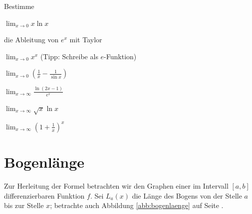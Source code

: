 \documentclass[%
11pt,%
twoside,%
titlepage,%
german,%
headsepline%
]{scrartcl}
\begin{document}
\begin{ueb}
Bestimme
\begin{enumeratea}
\item $\lim_{x\to0}x\ln x$
\item die Ableitung von $e^x$ mit Taylor
\item $\lim_{x\to0}x^x$ (Tipp: Schreibe als $e$-Funktion)
\item $\lim_{x\to0}\left(\frac{1}{x}-\frac{1}{\sin x}\right)$
\item $\lim_{x\to\infty}\frac{\ln(2x-1)}{e^x}$
\item $\lim_{x\to\infty}\sqrt{x}\ln x$
\item $\lim_{x\to\infty}\left(1+\frac{1}{x}\right)^x$
\end{enumeratea}
\end{ueb}

\section{Bogenl\"ange}

Zur Herleitung der Formel betrachten wir den Graphen einer im Intervall $[a,b]$ differenzierbaren Funktion $f$. Sei $L_a(x)$ die L\"ange des Bogens von der Stelle $a$ bis zur Stelle $x$; betrachte auch Abbildung \ref{abb:bogenlaenge} auf Seite \pageref{abb:bogenlaenge}.
\end{document}

